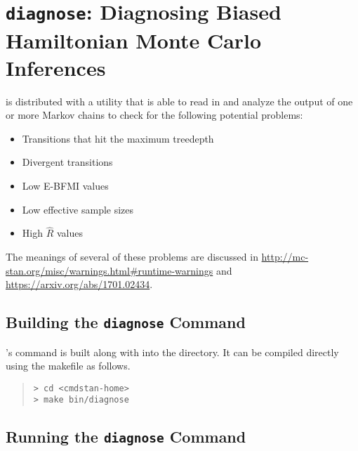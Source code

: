 \chapter{{\tt\bfseries diagnose}: Diagnosing Biased Hamiltonian Monte Carlo Inferences}\label{diagnose.chapter}

\noindent
\CmdStan is distributed with a utility that is able to read in and
analyze the output of one or more Markov chains to check for the
following potential problems:

\begin{itemize}
\item Transitions that hit the maximum treedepth
\item Divergent transitions
\item Low E-BFMI values
\item Low effective sample sizes
\item High $\hat{R}$ values
\end{itemize}

The meanings of several of these problems are discussed in
\url{http://mc-stan.org/misc/warnings.html#runtime-warnings}
and \url{https://arxiv.org/abs/1701.02434}.


\section{Building the {\tt\bfseries diagnose} Command}

\CmdStan's  command is built along with  into
the  directory. It can be compiled directly using the
makefile as follows.
%
\begin{quote}
\begin{Verbatim}[fontshape=sl]
> cd <cmdstan-home>
> make bin/diagnose
\end{Verbatim}
\end{quote}
%

\section{Running the {\tt\bfseries diagnose} Command}

